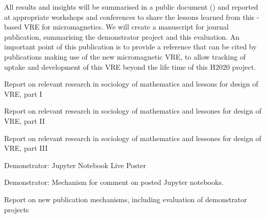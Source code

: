 \begin{workpackage}[id=social-aspects,wphases=0-48,
  title=Social Aspects,
  lead=UO,
  UORM=23,USHRM=8,USORM=6]
\begin{tasklist}
\begin{task}[title=Evaluation of Micromagnetic VRE,lead=USO,PM=6,
id=oommf-nb-evaluation,partners={UO,PS}]
  All results and insights will be summarised in a public document
  () and reported at appropriate
  workshops and conferences to share the lessons learned from this
  \Jupyter-based VRE for micromagnetics. We will create a manuscript
  for journal publication, summarising the demonstrator project and
  this evaluation. An important point of this publication is to
  provide a reference that can be cited by publications making use of
  the new micromagnetic VRE, to allow tracking of uptake and
  development of this VRE beyond the life time of this H2020 project.
\end{task}



\end{tasklist}


\begin{wpdelivs}
\begin{wpdeliv}[due=3,id=social-report,dissem=PU,nature=R,lead=UO]
 {Report on relevant research in sociology of mathematics and lessons
   for design of \TheProject VRE, part I}
\end{wpdeliv}
\begin{wpdeliv}[due=24,id=social-report-two,dissem=PU,nature=R,lead=UO]
 {Report on relevant research in sociology of mathematics and lessones
   for design of \TheProject VRE, part II}
\end{wpdeliv}
\begin{wpdeliv}[due=42,id=social-report-three,dissem=PU,nature=R,lead=UO]
 {Report on relevant research in sociology of mathematics and lessones
   for design of \TheProject VRE, part III}
\end{wpdeliv}

 \begin{wpdeliv}[due=36,id=social-poster,dissem=PU,nature=DEM,lead=USH]
   {Demonstrator: Jupyter Notebook Live Poster} 
\end{wpdeliv}
 \begin{wpdeliv}[due=24,id=social-poster,dissem=PU,nature=DEM,lead=USH]
   {Demonstrator: Mechanism for comment on posted Jupyter notebooks.} 
\end{wpdeliv}
\begin{wpdeliv}[due=42,id=social-publishing-report,dissem=PU,nature=R,lead=USH]
{Report on new publication mechanisms, including evaluation of
  demonstrator projects}
\end{wpdeliv}


\end{wpdelivs}
\end{workpackage}
